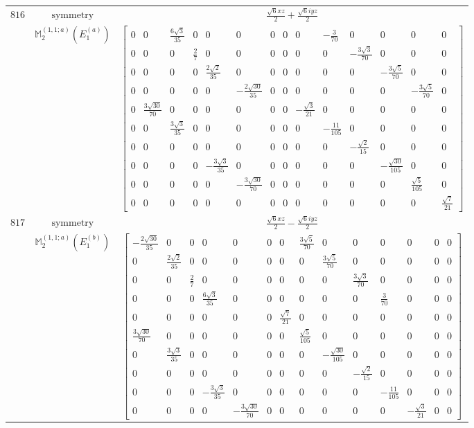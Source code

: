 \documentclass[fleqn,8pt,landscape]{jsarticle}
\begin{document}
\begin{longtable}{ccc}
$ 816 $ & $ \text{symmetry} $ & $ \frac{\sqrt{6} x z}{2} + \frac{\sqrt{6} i y z}{2} $ \\
$  $ & $ \mathbb{M}_{2}^{(1,1;a)}(E_{1}^{(a)}) $ & $ \begin{bmatrix} 0 & 0 & \frac{6 \sqrt{3}}{35} & 0 & 0 & 0 & 0 & 0 & 0 & - \frac{3}{70} & 0 & 0 & 0 & 0 \\ 0 & 0 & 0 & \frac{2}{7} & 0 & 0 & 0 & 0 & 0 & 0 & - \frac{3 \sqrt{3}}{70} & 0 & 0 & 0 \\ 0 & 0 & 0 & 0 & \frac{2 \sqrt{2}}{35} & 0 & 0 & 0 & 0 & 0 & 0 & - \frac{3 \sqrt{5}}{70} & 0 & 0 \\ 0 & 0 & 0 & 0 & 0 & - \frac{2 \sqrt{30}}{35} & 0 & 0 & 0 & 0 & 0 & 0 & - \frac{3 \sqrt{5}}{70} & 0 \\ 0 & \frac{3 \sqrt{30}}{70} & 0 & 0 & 0 & 0 & 0 & 0 & - \frac{\sqrt{3}}{21} & 0 & 0 & 0 & 0 & 0 \\ 0 & 0 & \frac{3 \sqrt{3}}{35} & 0 & 0 & 0 & 0 & 0 & 0 & - \frac{11}{105} & 0 & 0 & 0 & 0 \\ 0 & 0 & 0 & 0 & 0 & 0 & 0 & 0 & 0 & 0 & - \frac{\sqrt{2}}{15} & 0 & 0 & 0 \\ 0 & 0 & 0 & 0 & - \frac{3 \sqrt{3}}{35} & 0 & 0 & 0 & 0 & 0 & 0 & - \frac{\sqrt{30}}{105} & 0 & 0 \\ 0 & 0 & 0 & 0 & 0 & - \frac{3 \sqrt{30}}{70} & 0 & 0 & 0 & 0 & 0 & 0 & \frac{\sqrt{5}}{105} & 0 \\ 0 & 0 & 0 & 0 & 0 & 0 & 0 & 0 & 0 & 0 & 0 & 0 & 0 & \frac{\sqrt{7}}{21} \end{bmatrix} $ \\ \hline
$ 817 $ & $ \text{symmetry} $ & $ \frac{\sqrt{6} x z}{2} - \frac{\sqrt{6} i y z}{2} $ \\
$  $ & $ \mathbb{M}_{2}^{(1,1;a)}(E_{1}^{(b)}) $ & $ \begin{bmatrix} - \frac{2 \sqrt{30}}{35} & 0 & 0 & 0 & 0 & 0 & 0 & \frac{3 \sqrt{5}}{70} & 0 & 0 & 0 & 0 & 0 & 0 \\ 0 & \frac{2 \sqrt{2}}{35} & 0 & 0 & 0 & 0 & 0 & 0 & \frac{3 \sqrt{5}}{70} & 0 & 0 & 0 & 0 & 0 \\ 0 & 0 & \frac{2}{7} & 0 & 0 & 0 & 0 & 0 & 0 & \frac{3 \sqrt{3}}{70} & 0 & 0 & 0 & 0 \\ 0 & 0 & 0 & \frac{6 \sqrt{3}}{35} & 0 & 0 & 0 & 0 & 0 & 0 & \frac{3}{70} & 0 & 0 & 0 \\ 0 & 0 & 0 & 0 & 0 & 0 & \frac{\sqrt{7}}{21} & 0 & 0 & 0 & 0 & 0 & 0 & 0 \\ \frac{3 \sqrt{30}}{70} & 0 & 0 & 0 & 0 & 0 & 0 & \frac{\sqrt{5}}{105} & 0 & 0 & 0 & 0 & 0 & 0 \\ 0 & \frac{3 \sqrt{3}}{35} & 0 & 0 & 0 & 0 & 0 & 0 & - \frac{\sqrt{30}}{105} & 0 & 0 & 0 & 0 & 0 \\ 0 & 0 & 0 & 0 & 0 & 0 & 0 & 0 & 0 & - \frac{\sqrt{2}}{15} & 0 & 0 & 0 & 0 \\ 0 & 0 & 0 & - \frac{3 \sqrt{3}}{35} & 0 & 0 & 0 & 0 & 0 & 0 & - \frac{11}{105} & 0 & 0 & 0 \\ 0 & 0 & 0 & 0 & - \frac{3 \sqrt{30}}{70} & 0 & 0 & 0 & 0 & 0 & 0 & - \frac{\sqrt{3}}{21} & 0 & 0 \end{bmatrix} $ \\ \hline

\end{longtable}
\end{document}
